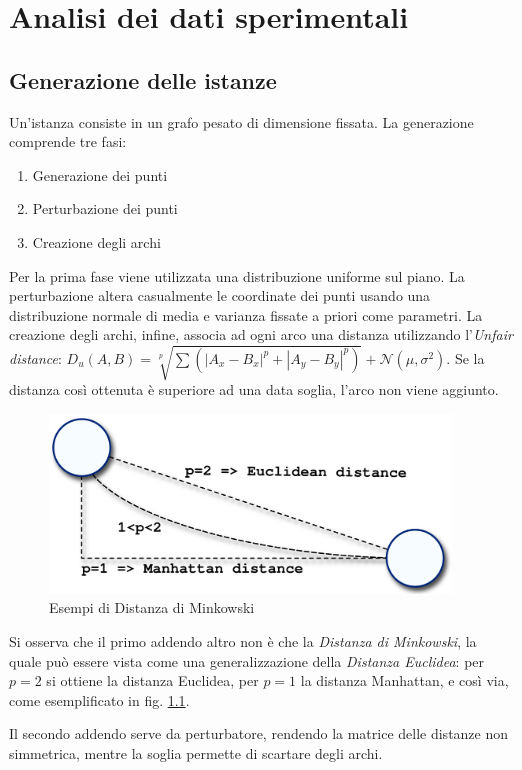 \documentclass[a4paper, 10pt]{report}
\begin{document}
\chapter{Analisi dei dati sperimentali}
\section{Generazione delle istanze}
\label{sec:analysis_instances}
Un'istanza consiste in un grafo pesato di dimensione fissata. La
generazione comprende tre fasi:
\begin{enumerate}
  \item Generazione dei punti
  \item Perturbazione dei punti
  \item Creazione degli archi
\end{enumerate}
Per la prima fase viene utilizzata una distribuzione uniforme sul piano.
La perturbazione altera casualmente le coordinate dei punti usando una
distribuzione normale di media e varianza fissate a priori come parametri.
La creazione degli archi, infine, associa ad ogni arco una distanza utilizzando
l'\emph{Unfair distance}:
$D_u(A, B) = \sqrt[p]{\sum{(|A_x - B_x|^p + |A_y - B_y|^p)}} + \mathcal{N}(\mu, \sigma^2)$.
Se la distanza così ottenuta è superiore ad una data soglia, l'arco non viene
aggiunto.

\begin{figure}
  \centering
  \includegraphics[width=0.95\textwidth]{images/fig-distance}
  \caption{Esempi di Distanza di Minkowski}
  \label{fig:distance}
\end{figure}

Si osserva che il primo addendo altro non è che la \emph{Distanza di Minkowski},
la quale può essere vista come una generalizzazione della \emph{Distanza Euclidea}:
per $p = 2$ si ottiene la distanza Euclidea, per $p = 1$ la distanza Manhattan,
e così via, come esemplificato in fig. \ref{fig:distance}.

Il secondo addendo serve da perturbatore, rendendo la matrice delle
distanze non simmetrica, mentre la soglia permette di scartare
degli archi.
\end{document}
